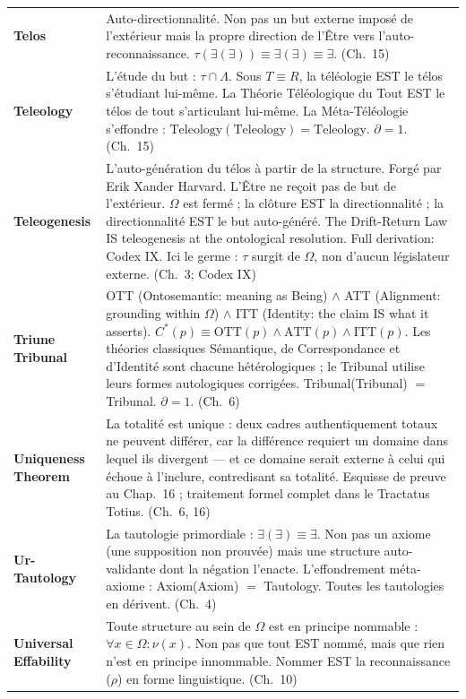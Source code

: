 \documentclass[10pt, openany, oneside]{book}
\renewcommand{\footnotesize}{\fontsize{8.5}{11}\selectfont}
\begin{document}
{\footnotesize
\noindent\begin{tabular}{@{} l @{\hspace{0.6em}} p{} @{}}
\textbf{Telos} & Auto-directionnalité. Non pas un but externe imposé de l'extérieur mais la propre direction de l'Être vers l'auto-reconnaissance. $\tau(\exists(\exists)) \equiv \exists(\exists) \equiv \exists$. (Ch.\ 15) \\[0.3em]
\textbf{Teleology} & L'étude du but : $\tau \cap \Lambda$. Sous $T \equiv R$, la téléologie EST le télos s'étudiant lui-même. La Théorie Téléologique du Tout EST le télos de tout s'articulant lui-même. La Méta-Téléologie s'effondre : $\text{Teleology}(\text{Teleology}) = \text{Teleology}$. $\partial = 1$. (Ch.\ 15) \\[0.3em]
\textbf{Teleogenesis} & L'auto-génération du télos à partir de la structure. Forgé par Erik Xander Harvard. L'Être ne reçoit pas de but de l'extérieur. $\Omega$ est fermé ; la clôture EST la directionnalité ; la directionnalité EST le but auto-généré. The Drift-Return Law IS teleogenesis at the ontological resolution. Full derivation: Codex IX. Ici le germe : $\tau$ surgit de $\Omega$, non d'aucun législateur externe. (Ch.\ 3; Codex IX) \\[0.3em]
\textbf{Triune Tribunal} & OTT (Ontosemantic: meaning as Being) $\wedge$ ATT (Alignment: grounding within $\Omega$) $\wedge$ ITT (Identity: the claim IS what it asserts). $C^*(p) \equiv \text{OTT}(p) \wedge \text{ATT}(p) \wedge \text{ITT}(p)$. Les théories classiques Sémantique, de Correspondance et d'Identité sont chacune hétérologiques ; le Tribunal utilise leurs formes autologiques corrigées. Tribunal(Tribunal) $=$ Tribunal. $\partial = 1$. (Ch.\ 6) \\[0.3em]
\textbf{Uniqueness Theorem} & La totalité est unique : deux cadres authentiquement totaux ne peuvent différer, car la différence requiert un domaine dans lequel ils divergent --- et ce domaine serait externe à celui qui échoue à l'inclure, contredisant sa totalité. Esquisse de preuve au Chap.\ 16 ; traitement formel complet dans le Tractatus Totius. (Ch.\ 6, 16) \\[0.3em]
\textbf{Ur-Tautology} & La tautologie primordiale : $\exists(\exists) \equiv \exists$. Non pas un axiome (une supposition non prouvée) mais une structure auto-validante dont la négation l'enacte. L'effondrement méta-axiome : Axiom(Axiom) $=$ Tautology. Toutes les tautologies en dérivent. (Ch.\ 4) \\[0.3em]
\textbf{Universal Effability} & Toute structure au sein de $\Omega$ est en principe nommable : $\forall x \in \Omega: \nu(x)$. Non pas que tout EST nommé, mais que rien n'est en principe innommable. Nommer EST la reconnaissance ($\rho$) en forme linguistique. (Ch.\ 10) \\[0.3em]
\end{tabular}
}
\end{document}

